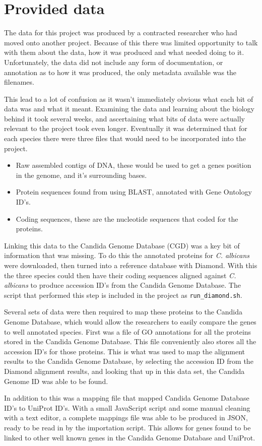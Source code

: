 \section{Provided data}
The data for this project was produced by a contracted researcher who had moved onto another project. Because of this there was limited opportunity to talk with them about the data, how it was produced and what needed doing to it. Unfortunately, the data did not include any form of documentation, or annotation as to how it was produced, the only metadata available was the filenames. 

This lead to a lot of confusion as it wasn't immediately obvious what each bit of data was and what it meant. Examining the data and learning about the biology behind it took several weeks, and ascertaining what bits of data were actually relevant to the project took even longer. Eventually it was determined that for each species there were three files that would need to be incorporated into the project.

\begin{itemize}
  \item Raw assembled contigs of DNA, these would be used to get a genes position in the genome, and it's surrounding bases. 
  \item Protein sequences found from using BLAST, annotated with Gene Ontology ID's.
  \item Coding sequences, these are the nucleotide sequences that coded for the proteins. 
\end{itemize}

Linking this data to the Candida Genome Database (CGD) was a key bit of information that was missing. To do this the annotated proteins\cite{albicans} for \textit{C. albicans} were downloaded, then turned into a reference database with Diamond. With this the three species could then have their coding sequences aligned against \textit{C. albicans} to produce accession ID's from the Candida Genome Database. The script that performed this step is included in the project as \texttt{run\_diamond.sh}.

Several sets of data were then required to map these proteins to the Candida Genome Database, which would allow the researchers to easily compare the genes to well annotated species. First was a file of GO annotations for all the proteins stored in the Candida Genome Database\cite{cgd-proteins}. This file conveniently also stores all the accession ID's for those proteins. This is what was used to map the alignment results to the Candida Genome Database, by selecting the accession ID from the Diamond alignment results, and looking that up in this data set, the Candida Genome ID was able to be found.

In addition to this was a mapping file that mapped Candida Genome Database ID's to UniProt\cite{uniprot} ID's. With a small JavaScript script and some manual cleaning with a text editor, a complete mappings file was able to be produced in JSON, ready to be read in by the importation script. This allows for genes found to be linked to other well known genes in the Candida Genome Database and UniProt.
